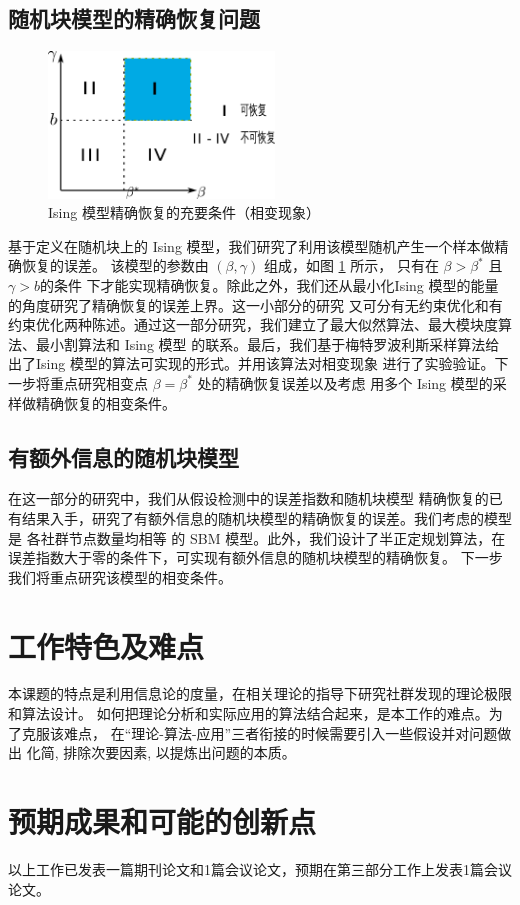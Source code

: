 \documentclass{ctexart}
\begin{document}
\subsection{随机块模型的精确恢复问题}
\begin{figure}
	\centering
\includegraphics[width=6cm]{phase_trans.pdf}
\caption{Ising 模型精确恢复的充要条件（相变现象）}\label{fig}
\end{figure}
基于定义在随机块上的 Ising 模型，我们研究了利用该模型随机产生一个样本做精确恢复的误差。
该模型的参数由 $(\beta, \gamma)$ 组成，如图 \ref{fig} 所示， 只有在 $\beta > \beta^*$ 且 $\gamma > b$的条件
下才能实现精确恢复。除此之外，我们还从最小化Ising 模型的能量的角度研究了精确恢复的误差上界。这一小部分的研究
又可分有无约束优化和有约束优化两种陈述。通过这一部分研究，我们建立了最大似然算法、最大模块度算法、最小割算法和 Ising 模型
的联系。最后，我们基于梅特罗波利斯采样算法给出了Ising 模型的算法可实现的形式。并用该算法对相变现象
进行了实验验证。下一步将重点研究相变点 $\beta = \beta^*$ 处的精确恢复误差以及考虑
用多个 Ising 模型的采样做精确恢复的相变条件。

\subsection{有额外信息的随机块模型}
在这一部分的研究中，我们从假设检测中的误差指数和随机块模型
精确恢复的已有结果入手，研究了有额外信息的随机块模型的精确恢复的误差。我们考虑的模型是
各社群节点数量均相等 的 SBM 模型。此外，我们设计了半正定规划算法，在误差指数大于零的条件下，可实现有额外信息的随机块模型的精确恢复。
下一步我们将重点研究该模型的相变条件。

\section{工作特色及难点}
本课题的特点是利用信息论的度量，在相关理论的指导下研究社群发现的理论极限和算法设计。
如何把理论分析和实际应用的算法结合起来，是本工作的难点。为了克服该难点，
在“理论-算法-应用”三者衔接的时候需要引入一些假设并对问题做出
化简, 排除次要因素, 以提炼出问题的本质。
\section{预期成果和可能的创新点}
以上工作已发表一篇期刊论文和1篇会议论文，预期在第三部分工作上发表1篇会议论文。
\end{document}
